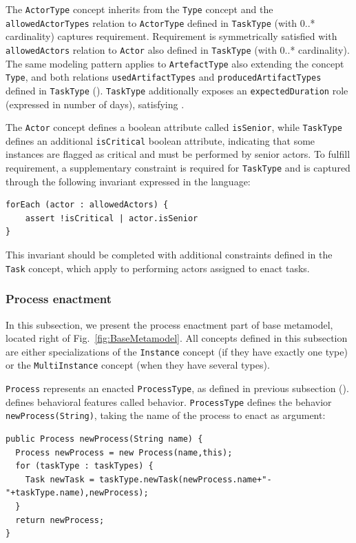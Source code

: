 The \texttt{ActorType} concept inherits from the \texttt{Type} concept and the
\texttt{allowedActorTypes} relation to \texttt{ActorType} defined in
\texttt{TaskType} (with 0..* cardinality) captures  requirement.
Requirement  is symmetrically satisfied with \texttt{allowedActors}
relation to \texttt{Actor} also defined in \texttt{TaskType} (with 0..*
cardinality). The same modeling pattern applies to \texttt{ArtefactType} also
extending the concept \texttt{Type}, and both relations
\texttt{usedArtifactTypes} and \texttt{producedArtifactTypes} defined in
\texttt{TaskType} (). \texttt{TaskType} additionally exposes an
\texttt{expectedDuration} role (expressed in number of days), satisfying
.

The \texttt{Actor} concept defines a boolean attribute called
\texttt{isSenior}, while \texttt{TaskType} defines an additional
\texttt{isCritical} boolean attribute, indicating that some instances are
flagged as critical and must be performed by senior actors. To fulfill
 requirement, a supplementary constraint is required for
\texttt{TaskType} and is captured through the following invariant expressed in
the \FML language:
\begin{lstlisting}
forEach (actor : allowedActors) {
    assert !isCritical | actor.isSenior
}
\end{lstlisting}

This invariant should be completed with additional constraints defined in the
\texttt{Task} concept, which apply to performing actors assigned to enact
tasks.

\subsubsection{Process enactment}
\label{sec:ProcessEnactment}
In this subsection, we present the process enactment part of base metamodel,
located right of Fig.~\ref{fig:BaseMetamodel}. All concepts defined in this
subsection are either specializations of the \texttt{Instance} concept (if they
  have exactly one type) or the \texttt{MultiInstance} concept (when they have
  several types).

\texttt{Process} represents an enacted \texttt{ProcessType}, as defined in
previous subsection (). \FML defines behavioral features called
behavior. \texttt{ProcessType} defines the behavior
\texttt{newProcess(String)}, taking the name of the process to enact as
argument:

\begin{lstlisting}
public Process newProcess(String name) {
  Process newProcess = new Process(name,this);
  for (taskType : taskTypes) {
    Task newTask = taskType.newTask(newProcess.name+"-"+taskType.name),newProcess);
  }
  return newProcess;
}
\end{lstlisting}

